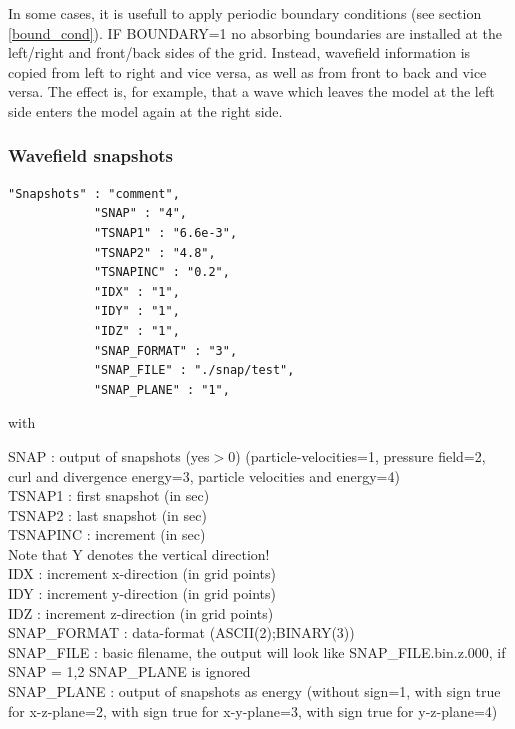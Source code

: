 \documentclass[11pt,onecolumn,oneside]{article}
\begin{document}
 In some cases, it is usefull to apply periodic boundary conditions (see section \ref{bound_cond}). IF BOUNDARY=1 no absorbing boundaries are installed at the left/right and front/back sides of the grid. Instead, wavefield information is copied from left to right and vice versa, as well as from front to back and vice versa. The effect is, for example, that a wave which leaves the model at the left side enters the model again at the right side.

\subsubsection{Wavefield snapshots}
\begin{verbatim}
"Snapshots" : "comment",
			"SNAP" : "4",
			"TSNAP1" : "6.6e-3",
			"TSNAP2" : "4.8",
			"TSNAPINC" : "0.2",
			"IDX" : "1",
			"IDY" : "1",
			"IDZ" : "1",
			"SNAP_FORMAT" : "3",
			"SNAP_FILE" : "./snap/test",
			"SNAP_PLANE" : "1",
\end{verbatim}

with

SNAP : output of snapshots (yes$>$0) (particle-velocities=1, pressure field=2, curl and divergence energy=3, particle velocities and energy=4)\\
TSNAP1 : first snapshot (in sec)\\
TSNAP2 : last snapshot (in sec)\\
TSNAPINC : increment (in sec)\\
Note that Y denotes the vertical direction!\\
IDX : increment x-direction (in grid points)\\
IDY : increment y-direction (in grid points)\\
IDZ : increment z-direction (in grid points)\\
SNAP\_FORMAT : data-format (ASCII(2);BINARY(3))\\
SNAP\_FILE : basic filename, the output will look like SNAP\_FILE.bin.z.000, if SNAP = 1,2 SNAP\_PLANE is ignored\\
SNAP\_PLANE : output of snapshots as energy (without sign=1, with sign true for x-z-plane=2, with sign true for x-y-plane=3, with sign true for y-z-plane=4)\\
\end{document}
